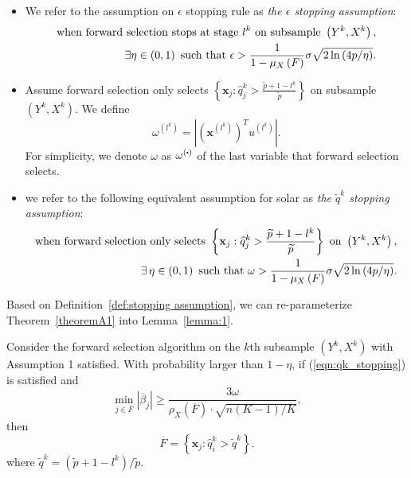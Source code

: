 \documentclass[11pt,review,authoryear]{elsarticle}
\begin{document}
\begin{appendices}
\begin{itemize}
  \item We refer to the \citet{zhang09} assumption on $\epsilon$ stopping rule as \emph{the $\epsilon$ stopping assumption}:
  \begin{eqnarray}
    \mbox{when forward selection stops at stage } l^k \mbox{ on subsample } \left(Y^k, X^k\right), \\ \notag
    \exists \eta \in \left( 0, 1\right) \mbox{ such that }\epsilon>\frac{1}{1-\mu_{X}\left(F\right)}\sigma\sqrt{2\ln\left(4p/\eta\right)}.
  \end{eqnarray}
  \item Assume forward selection only selects $\left\{ \mathbf{x}_j:\widehat{q}_j^k > \frac{\widetilde{p} + 1 - l^k} {\widetilde{p}} \right\}$ on subsample $\left(Y^k, X^k \right)$. We define 
  \begin{displaymath}
    \omega^{\left(l^k\right)} = \left\vert \left( \mathbf{x}^{\left( l^k \right)}\right) ^T u^{\left(l^k \right)} \right\vert.
  \end{displaymath}
  For simplicity, we denote $\omega$ as $\omega^{\left( \bigcdot \right)}$ of the last variable that forward selection selects.
  \item we refer to the following equivalent assumption for solar as \emph{the $\widetilde{q}^k$ stopping assumption}:
  \begin{align}
    \mbox{when forward selection only selects } \left\{ \mathbf{x}_j:\widehat{q}_j^k > \frac{\widetilde{p} + 1 - l^k} {\widetilde{p}} \right\} \mbox{ on } \left(Y^k, X^k \right), \notag \\
    \exists\, \eta \in \left( 0, 1\right) \mbox{ such that } \omega >\frac{1}{1-\mu_{X}\left(F\right)}\sigma\sqrt{2\ln\left(4p/\eta\right)}. \label{eqn:qk_stopping}
  \end{align}
\end{itemize}
\medskip

Based on Definition~\ref{def:stopping assumption}, we can re-parameterize Theorem~\ref{theoremA1} into Lemma~\ref{lemma:1}.

\begin{lemma}
  Consider the forward selection algorithm on the $k$th subsample $\left(Y^{k},X^{k}\right)$ with Assumption 1 satisfied. With probability larger than $1-\eta$, if (\ref{eqn:qk_stopping}) is satisfied and
  \begin{displaymath}
      \min_{j\in\overline{F}}\left|\overline{\beta}_{j}\right|\geqslant\frac{3\omega}{\rho_{X}\left(\overline{F}\right)\cdot\sqrt{n\left(K-1\right)/K}},
  \end{displaymath}
  then
  \begin{displaymath}
      \overline{F}=\left\{ \mathbf{x}_{j}:\widehat{q}_{i}^{k}>\widetilde{q}^{k}\right\}.
  \end{displaymath}
  where $\widetilde{q}^k = \left(\widetilde{p} + 1 - l^k\right) / \widetilde{p}$.
  \label{lemma:1}
\end{lemma}


\end{appendices}
\end{document}
